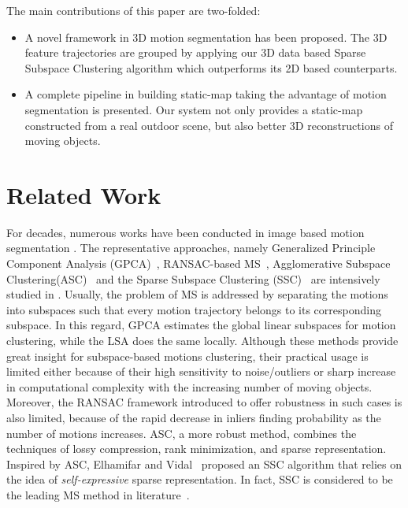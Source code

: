 \documentclass[10pt,twocolumn,letterpaper]{article}  %
\begin{document}
The main contributions of this paper are two-folded:
\begin{itemize}
\item{A novel framework in 3D motion segmentation has been proposed. The 3D feature trajectories are grouped by applying our 3D data based Sparse Subspace Clustering algorithm which outperforms its 2D based counterparts.} 
\item{A complete pipeline in building static-map taking the advantage of motion segmentation is presented. Our system not only provides a static-map constructed from a real outdoor scene, but also better 3D reconstructions of moving objects.}
\end{itemize}


\section{Related Work}
\label{relatedWork}
For decades, numerous works have been conducted in image based motion segmentation \cite{c1}. The representative approaches, namely Generalized Principle Component Analysis (GPCA)~\cite{c9}, RANSAC-based MS~\cite{c16}, Agglomerative Subspace Clustering(ASC)~\cite{c6} and the Sparse Subspace Clustering (SSC)~\cite{c2} are intensively studied in \cite{c1}. Usually, the problem of MS is addressed by separating the motions into subspaces such that every motion trajectory belongs to its corresponding subspace. In this regard, GPCA estimates the global linear subspaces for motion clustering, while the LSA does the same locally. Although these methods provide great insight for subspace-based motions clustering, their practical usage is limited either because of their high sensitivity to noise/outliers or sharp increase in computational complexity with the increasing number of moving objects. Moreover, the RANSAC framework introduced to offer robustness in such cases is also limited, because of the rapid decrease in inliers finding  probability as the number of motions increases. ASC, a more robust method, combines the techniques of lossy compression, rank minimization, and sparse representation. Inspired by ASC, Elhamifar and Vidal~\cite{c2} proposed an SSC algorithm that relies on the idea of \textit{self-expressive} sparse representation. In fact, SSC is considered to be the leading MS method in literature~\cite{c13}.
\end{document}
